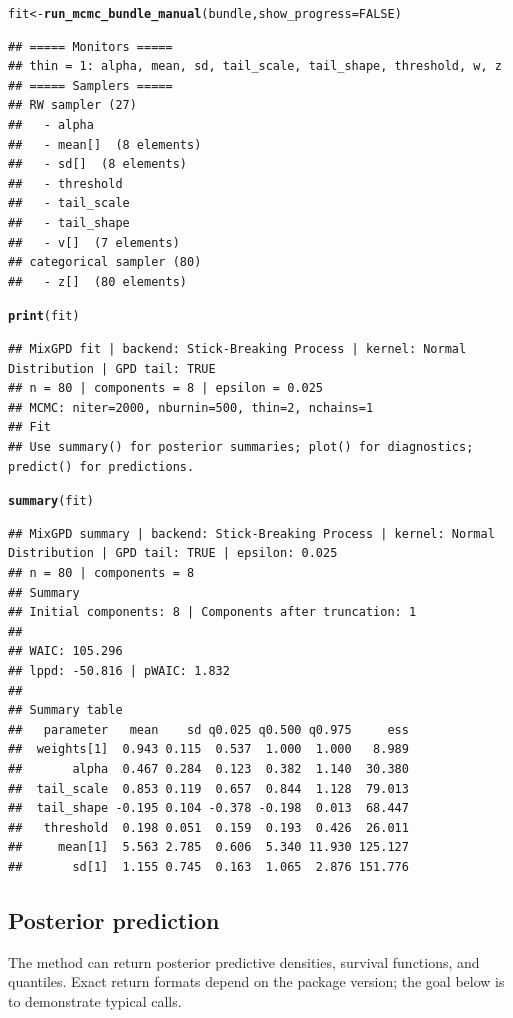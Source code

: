 \documentclass[article]{jss}\usepackage[]{graphicx}\usepackage[]{xcolor}
\makeatletter
\newcommand{\hlnum}[1]{\textcolor[rgb]{0.686,0.059,0.569}{#1}}%
\newcommand{\hldef}[1]{\textcolor[rgb]{0.345,0.345,0.345}{#1}}%
\newcommand{\hlkwb}[1]{\textcolor[rgb]{0.69,0.353,0.396}{#1}}%
\newcommand{\hlkwc}[1]{\textcolor[rgb]{0.333,0.667,0.333}{#1}}%
\newcommand{\hlkwd}[1]{\textcolor[rgb]{0.737,0.353,0.396}{\textbf{#1}}}%
\newenvironment{kframe}{%
 \def\at@end@of@kframe{}%
 \ifinner\ifhmode%
  \def\at@end@of@kframe{\end{minipage}}%
  \begin{minipage}{\columnwidth}%
 \fi\fi%
 \def\FrameCommand##1{\hskip\@totalleftmargin \hskip-\fboxsep
 \colorbox{shadecolor}{##1}\hskip-\fboxsep
     \hskip-\linewidth \hskip-\@totalleftmargin \hskip\columnwidth}%
 \MakeFramed {\advance\hsize-\width
   \@totalleftmargin\z@ \linewidth\hsize
   \@setminipage}}%
 {\par\unskip\endMakeFramed%
 \at@end@of@kframe}
\newenvironment{knitrout}{}{} %
\makeatother
\begin{document}
\begin{knitrout}
\begin{kframe}
\begin{alltt}
\hldef{fit} \hlkwb{<-} \hlkwd{run_mcmc_bundle_manual}\hldef{(bundle,} \hlkwc{show_progress} \hldef{=} \hlnum{FALSE}\hldef{)}
\end{alltt}
\begin{verbatim}
## ===== Monitors =====
## thin = 1: alpha, mean, sd, tail_scale, tail_shape, threshold, w, z
## ===== Samplers =====
## RW sampler (27)
##   - alpha
##   - mean[]  (8 elements)
##   - sd[]  (8 elements)
##   - threshold
##   - tail_scale
##   - tail_shape
##   - v[]  (7 elements)
## categorical sampler (80)
##   - z[]  (80 elements)
\end{verbatim}
\begin{alltt}
\hlkwd{print}\hldef{(fit)}
\end{alltt}
\begin{verbatim}
## MixGPD fit | backend: Stick-Breaking Process | kernel: Normal Distribution | GPD tail: TRUE
## n = 80 | components = 8 | epsilon = 0.025
## MCMC: niter=2000, nburnin=500, thin=2, nchains=1 
## Fit
## Use summary() for posterior summaries; plot() for diagnostics; predict() for predictions.
\end{verbatim}
\begin{alltt}
\hlkwd{summary}\hldef{(fit)}
\end{alltt}
\begin{verbatim}
## MixGPD summary | backend: Stick-Breaking Process | kernel: Normal Distribution | GPD tail: TRUE | epsilon: 0.025
## n = 80 | components = 8
## Summary
## Initial components: 8 | Components after truncation: 1
## 
## WAIC: 105.296
## lppd: -50.816 | pWAIC: 1.832
## 
## Summary table
##   parameter   mean    sd q0.025 q0.500 q0.975     ess
##  weights[1]  0.943 0.115  0.537  1.000  1.000   8.989
##       alpha  0.467 0.284  0.123  0.382  1.140  30.380
##  tail_scale  0.853 0.119  0.657  0.844  1.128  79.013
##  tail_shape -0.195 0.104 -0.378 -0.198  0.013  68.447
##   threshold  0.198 0.051  0.159  0.193  0.426  26.011
##     mean[1]  5.563 2.785  0.606  5.340 11.930 125.127
##       sd[1]  1.155 0.745  0.163  1.065  2.876 151.776
\end{verbatim}
\end{kframe}
\end{knitrout}

\subsection{Posterior prediction}

The  method can return posterior predictive densities, survival functions, and quantiles.
Exact return formats depend on the package version; the goal below is to demonstrate typical calls.
\end{document}
